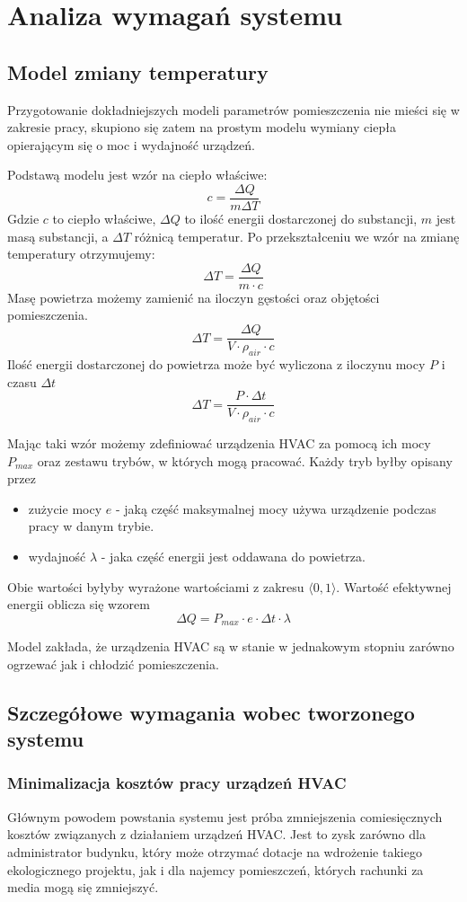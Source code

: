 \chapter{Analiza wymagań systemu}

\section{Model zmiany temperatury}
Przygotowanie dokładniejszych modeli parametrów pomieszczenia nie mieści się w zakresie pracy, skupiono się zatem na prostym modelu wymiany ciepła opierającym się o moc i wydajność urządzeń.

Podstawą modelu jest wzór na ciepło właściwe:
$$ c = \frac{\Delta Q}{m \Delta T} $$
Gdzie $c$ to ciepło właściwe, $\Delta Q$ to ilość energii dostarczonej do substancji, $m$ jest masą substancji, a $\Delta T$ różnicą temperatur.
Po przekształceniu we wzór na zmianę temperatury otrzymujemy:
$$ \Delta T = \frac{\Delta Q}{m \cdot c} $$
Masę powietrza możemy zamienić na iloczyn gęstości oraz objętości pomieszczenia.
$$ \Delta T = \frac{\Delta Q}{V \cdot \rho_{air} \cdot c} $$
Ilość energii dostarczonej do powietrza może być wyliczona z iloczynu mocy $P$ i czasu $\Delta t$
$$ \Delta T = \frac{P \cdot \Delta t}{V \cdot \rho_{air} \cdot c} $$

Mając taki wzór możemy zdefiniować urządzenia HVAC za pomocą ich mocy $P_{max}$ oraz zestawu trybów, w których mogą pracować.
Każdy tryb byłby opisany przez 
\begin{itemize}
    \item zużycie mocy $e$ - jaką część maksymalnej mocy używa urządzenie podczas pracy w danym trybie. 
    \item wydajność $\lambda$ - jaka część energii jest oddawana do powietrza. 
\end{itemize}
Obie wartości byłyby wyrażone wartościami z zakresu $\langle 0,1 \rangle$. Wartość efektywnej energii oblicza się wzorem
$$ \Delta Q = P_{max} \cdot e \cdot \Delta t \cdot \lambda $$

Model zakłada, że urządzenia HVAC są w stanie w jednakowym stopniu zarówno ogrzewać jak i chłodzić pomieszczenia. 

\section{Szczegółowe wymagania wobec tworzonego systemu} \label{sec:wymagania}
\subsection*{Minimalizacja kosztów pracy urządzeń HVAC}
Głównym powodem powstania systemu jest próba zmniejszenia comiesięcznych kosztów związanych z działaniem urządzeń HVAC. Jest to zysk zarówno dla administrator budynku, który może otrzymać dotacje na wdrożenie takiego ekologicznego projektu, jak i dla najemcy pomieszczeń, których rachunki za media mogą się zmniejszyć.

